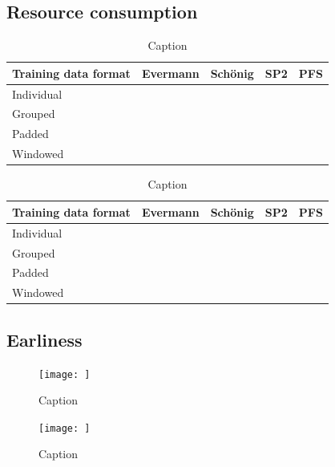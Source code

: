 \subsection*{Resource consumption}
\begin{table}
    \centering
    \begin{tabular}{l|cccc}
        Training data format & Evermann & Schönig & SP2 & PFS\\
        \hline
        Individual &&&\\
        Grouped &&&\\
        Padded &&&\\
        Windowed &&&\\
    \end{tabular}
    \caption{Caption}
    \label{tab:resources_bpic2011}
\end{table}

\begin{table}
    \centering
    \begin{tabular}{l|cccc}
        Training data format & Evermann & Schönig & SP2 & PFS\\
        \hline
        Individual &&&\\
        Grouped &&&\\
        Padded &&&\\
        Windowed &&&\\
    \end{tabular}
    \caption{Caption}
    \label{tab:resources_bpic2017}
\end{table}

\subsection*{Earliness}
\begin{figure}
    \centering
    \texttt{[image: ]}
    \caption{Caption}
    \label{fig:earliness_bpic2011}
\end{figure}

\begin{figure}
    \centering
    \texttt{[image: ]}
    \caption{Caption}
    \label{fig:earliness_bpic2017}
\end{figure}